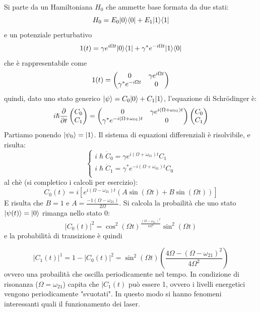 Si parte da un Hamiltoniana $H_0$ che ammette base formata da due stati:
\[
    H_0 = E_0 \ketbra{0}{0} + E_1\ketbra{1}{1} 
\]
e un potenziale perturbativo
\[
    \V(t) = \gamma e^{i\Omega t}\ketbra{0}{1} + \gamma^* e^{-i\Omega t}\ketbra{1}{0}
\]
che è rappresentabile come
\[
\V(t)=\begin{pmatrix}
0 & \gamma e^{i\Omega t}\\
\gamma^* e^{-i\Omega t} & 0
\end{pmatrix}
\]
quindi, dato uno stato generico $\Ket \psi = C_0\Ket 0 + C_1 \Ket 1$, l'equazione di Schrödinger è:
\[
    i\hslash \tderiv{}
    \begin{pmatrix}
    C_0\\ C_1
    \end{pmatrix}
    = \begin{pmatrix}
    0 & \gamma e^{i(\Omega + \omega_{01}) t}\\
    \gamma^* e^{-i(\Omega + \omega_{01}) t} & 0
    \end{pmatrix}
    \begin{pmatrix}
    C_0\\ C_1
    \end{pmatrix}
\]
Partiamo ponendo $\Ket {\psi_0} = \Ket 1$. Il sistema di equazioni differenziali è risolvibile, e risulta:
\[
\begin{cases}
    i\hslash \dot C_0 =  \gamma e^{i(\Omega + \omega_{01}) t} C_1 \\
    i\hslash \dot C_1 =  \gamma^* e^{-i(\Omega + \omega_{01}) t} C_0 \\
\end{cases}
\]
al chè (si completico i calcoli per esercizio):
\[
    C_0(t) = i\left[e^{i(\Omega - \omega_{21})t} \left(A\sin(\Omega t) + B\sin (\Omega t)\right)\right]
\]
E risulta che $B = 1$ e $A = \frac{-1(\Omega - \omega_{21})}{2\Omega}$. Si calcola la probailità che uno stato $\Ket {\psi(t)} = \Ket 0$ rimanga nello stato 0:
\[
    |C_0(t)|^2 = \cos^2(\Omega t) ^ \frac{(\Omega - \omega_{21})^2}{4\Omega^2}\sin^2(\Omega t)
\]
e la probabilità di transizione è quindi 

\[
    |C_1(t)|^1 = 1 - |C_0(t)|^2 = \sin^2(\Omega t)\left(\frac{4\Omega - (\Omega - \omega_{21})^2}{4\Omega^2}\right)
\]
ovvero una probailità che oscilla periodicamente nel tempo. In condizione di risonanza ($\Omega = \omega_{21}$) capita che $|C_1(t)$ può essere 1, ovvero i livelli energetici vengono periodicamente "svuotati". In questo modo si hanno fenomeni interessanti quali il funzionamento dei laser.